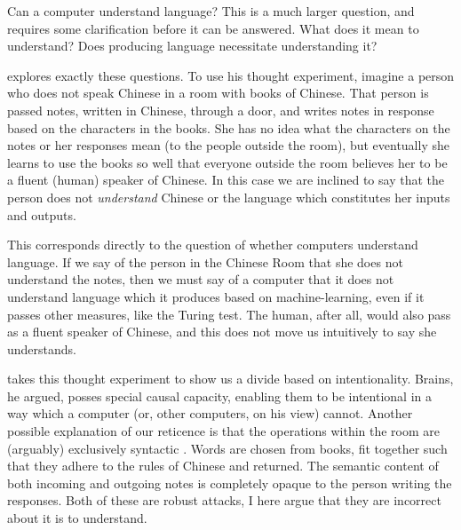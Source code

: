 \documentclass[man,12pt,natbib]{apa6}
\begin{document}
Can a computer understand language?
This is a much larger question, and requires some clarification before it can
be answered. What does it mean to understand? Does producing language
necessitate understanding it?

\citet{Searle80} explores exactly these questions. To use his thought
experiment, imagine a person who does not speak Chinese in a room with books of
Chinese. That person is passed notes, written in Chinese, through a door, and
writes notes in response based on the characters in the books. She has no idea
what the characters on the notes or her responses mean (to the people outside
the room), but eventually she learns to use the books so well that everyone
outside the room believes her to be a fluent (human) speaker of Chinese. In
this case we are inclined to say that the person does not \emph{understand}
Chinese or the language which constitutes her inputs and outputs.

This corresponds directly to the question of whether computers understand
language. If we say of the person in the Chinese Room that she does not
understand the notes, then we must say of a computer that it does not
understand language which it produces based on machine-learning, even if it
passes other measures, like the Turing test. The human, after all, would also
pass as a fluent speaker of Chinese, and this does not move us intuitively to
say she understands.

\citet{Searle80} takes this thought experiment to show us a divide based on
intentionality. Brains, he argued, posses special causal capacity, enabling
them to be intentional in a way which a computer (or, other computers, on his
view) cannot.
Another possible explanation of our reticence is that the operations within the
room are (arguably) exclusively syntactic \citep{Marconi96}. Words are chosen
from books, fit together such that they adhere to the rules of Chinese and
returned. The semantic content of both incoming and outgoing notes is
completely opaque to the person writing the responses.
Both of these are robust attacks, I here argue that they are incorrect about 
it is to understand.
\end{document}
